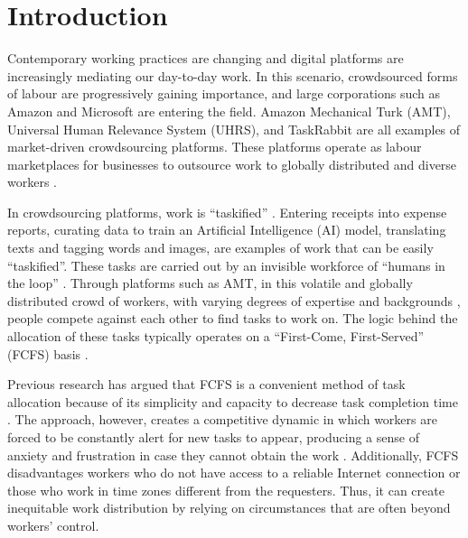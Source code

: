 
\section{Introduction}

Contemporary working practices are changing and digital platforms are increasingly mediating our day-to-day work. In this scenario, crowdsourced forms of labour are progressively gaining importance, and large corporations such as Amazon and Microsoft are entering the field. Amazon Mechanical Turk (AMT), Universal Human Relevance System (UHRS), and TaskRabbit are all examples of market-driven crowdsourcing platforms. These platforms operate as labour marketplaces for businesses to outsource work to globally distributed and diverse workers \cite{10.1145/1753846.1753873}. %

In crowdsourcing platforms, work is ``taskified'' \cite{amer2016toward}. Entering receipts into expense reports, curating data to train an Artificial Intelligence (AI) model, translating texts and tagging words and images, are examples of work that can be easily ``taskified''. These tasks are carried out by an invisible workforce of ``humans in the loop'' \cite{gray2019ghost}. Through platforms such as AMT, in this volatile and globally distributed crowd of workers, with varying degrees of expertise and backgrounds \cite{10.1145/1753846.1753873}, people compete against each other to find tasks to work on. The logic behind the allocation of these tasks typically operates on a ``First-Come, First-Served'' (FCFS) basis \cite{yu2013bringing, han2019all}.

Previous research has argued that FCFS is a convenient method of task allocation because of its simplicity and capacity to decrease task completion time \cite{kamel2020tasks}. The approach, however, creates a competitive dynamic in which workers are forced to be constantly alert for new tasks to appear, producing a sense of anxiety and frustration in case they cannot obtain the work \cite{gray2019ghost}. Additionally, FCFS disadvantages workers who do not have access to a reliable Internet connection or those who work in time zones different from the requesters.
Thus, it can create inequitable work distribution by relying on circumstances that are often beyond workers' control. 


